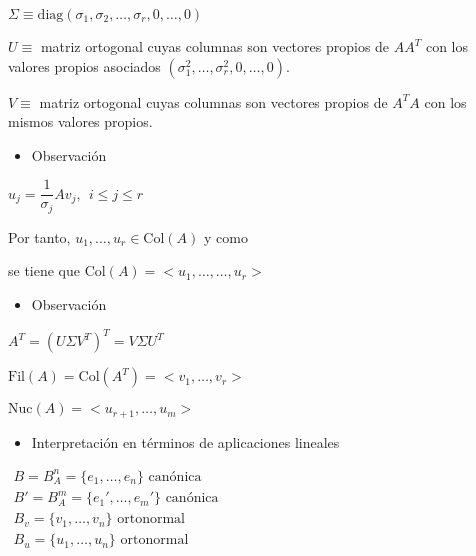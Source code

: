 \documentclass[12pt]{article}
\begin{document}
$\Sigma\equiv\mathrm{diag}(\sigma_1,\sigma_2,\hdots,\sigma_r,0,\hdots,0)$

$U\equiv$ matriz ortogonal cuyas columnas son vectores propios de $AA^T$ con los valores propios asociados $(\sigma_1^2,\hdots,\sigma_r^2,0,\hdots,0)$. 

$V\equiv$ matriz ortogonal cuyas columnas son vectores propios de $A^TA$ con los mismos valores propios.
\begin{itemize}[label=\color{red}\textbullet, leftmargin=*]
    \item \color{lightblue}Observación
\end{itemize}
$u_j=\dfrac{1}{\sigma_j}Av_j,~~i\le j\le r$

Por tanto, $u_1,\hdots, u_r\in\mathrm{Col}(A)$ y como \begin{center}
\end{center}se tiene que $\mathrm{Col}(A)=<u_1,\hdots,\hdots,u_r>$
\begin{itemize}[label=\color{red}\textbullet, leftmargin=*]
    \item \color{lightblue} Observación 
\end{itemize}

$A^T=(U\Sigma V^T)^T=V\Sigma U^T$

$\mathrm{Fil}(A)=\mathrm{Col}(A^T)=<v_1,\hdots,v_r>$

$\mathrm{Nuc}(A)=<u_{r+1},\hdots,u_m>$

\begin{itemize}[label=\color{red}\textbullet, leftmargin=*]
    \item \color{lightblue}Interpretación en términos de aplicaciones lineales
\end{itemize}
\begin{center}
\hspace{2cm}
$\begin{array}{r}
B=B_A^n=\{e_1,\hdots,e_n\} \text{ canónica}\\
B'=B_A^m=\{e_1',\hdots,e_m'\} \text{ canónica}\\
B_v=\{v_1,\hdots,v_n\} \text{ ortonormal}\\
B_u=\{u_1,\hdots,u_n\} \text{ ortonormal}\\
\end{array}$
\end{center}
\end{document}
